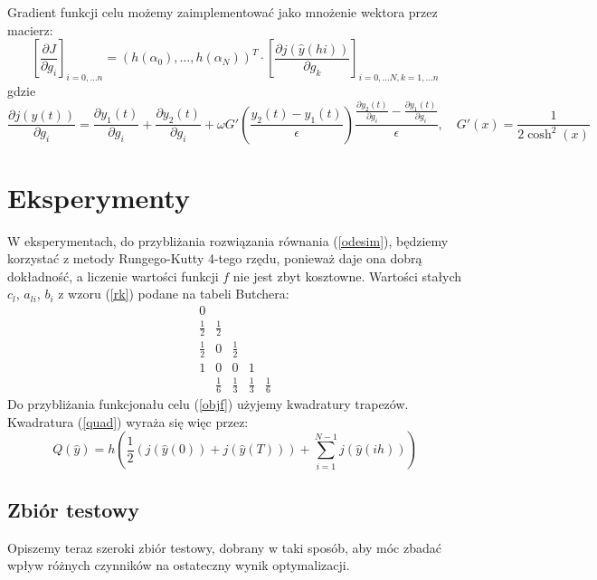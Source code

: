 \documentclass[licencjacka]{pracamgr}
\begin{document}
Gradient funkcji celu możemy zaimplementować jako mnożenie wektora przez macierz:
\begin{equation}
  {\left[\frac{\partial J}{\partial g_i}\right]}_{i = 0, \ldots n} = {\left(h(\alpha_0),\ldots,h(\alpha_N)\right)}^T \cdot {\left[\frac{\partial j(\hat{y}(hi))}{\partial g_k}\right]}_{i = 0, \ldots N, k = 1, \ldots n}
\end{equation}
gdzie
\begin{equation}
  \frac{\partial j(y(t))}{\partial g_i} = \frac{\partial y_1(t)}{\partial g_i} + \frac{\partial y_2(t)}{\partial g_i} + \omega G'\left(\frac{y_2(t) - y_1(t)}{\epsilon}\right)\frac{\frac{\partial y_2(t)}{\partial g_i} - \frac{\partial y_1(t)}{\partial g_i}}{\epsilon},\quad G'(x) = \frac{1}{2\cosh^2(x)}
\end{equation}
\chapter{Eksperymenty}
W eksperymentach, do przybliżania rozwiązania równania (\ref{odesim}), będziemy korzystać z metody Rungego-Kutty 4-tego rzędu, ponieważ daje ona dobrą dokładność, a liczenie wartości funkcji $f$ nie jest zbyt kosztowne. Wartości stałych $c_l$, $a_{li}$, $b_i$ z wzoru (\ref{rk}) podane na tabeli Butchera:
\begin{equation}\label{butcher}
  \begin{array}
    {c|cccc}
    0\\
    \frac{1}{2} & \frac{1}{2}\\
    \frac{1}{2} &0 &\frac{1}{2} \\
    1& 0& 0& 1\\
    \hline{}
    & \frac{1}{6} &\frac{1}{3} &\frac{1}{3} &\frac{1}{6} 
  \end{array}
\end{equation}
Do przybliżania funkcjonału celu (\ref{objf}) użyjemy kwadratury trapezów. Kwadratura (\ref{quad}) wyraża się więc przez:
\begin{equation} \label{trapezoidal}
  Q(\hat{y}) = h\left(\frac{1}{2}(j(\hat{y}(0)) + j(\hat{y}(T))) + \sum_{i=1}^{N-1} j(\hat{y}(ih))\right)
\end{equation}

\section{Zbiór testowy}
Opiszemy teraz szeroki zbiór testowy, dobrany w taki sposób, aby móc zbadać wpływ różnych czynników na ostateczny wynik optymalizacji.
\end{document}

